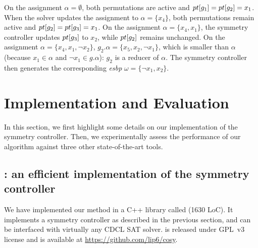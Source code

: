  On the assignment $\alpha = \emptyset$, both permutations are active and
 $pt[g_1] = pt[g_2] = x_1$. When the solver updates the assignment to $\alpha = \{ x_4\}$, both permutations remain active and $pt[g_2] = pt[g_3] = x_1$. On the assignment $\alpha = \{  x_4,  x_1\}$, the symmetry controller updates $pt[g_3]$ to $x_2$, while $pt[g_2]$ remains unchanged. On the assignment $\alpha = \{  x_4,  x_1, \neg x_2 \}$, $g_2.\alpha = \{  x_5,  x_2, \neg x_1
 \}$, which is smaller than $\alpha$ (because $ x_1 \in \alpha$ and $ \neg x_1 \in g.\alpha$):
 $g_2$ is a reducer of $\alpha$. The symmetry controller then generates the
 corresponding \textit{esbp} $\omega = \{ \neg x_1, x_2 \}$.
 
 
\section{Implementation and Evaluation}\label{sec:eval}
In this section, we first highlight some details on our implementation of the
symmetry controller. Then, we experimentally assess the performance of our
algorithm against three other state-of-the-art tools.
\subsection{\libdsb{}: an efficient implementation of the symmetry controller}
We have implemented our method in a C++ library called \libdsb{} (1630 LoC). It
implements a symmetry controller as described in the previous section, and can
be interfaced with virtually any CDCL SAT solver. \libdsb{} is released under
GPL~v3 license and is available at \url{https://github.com/lip6/cosy}.
